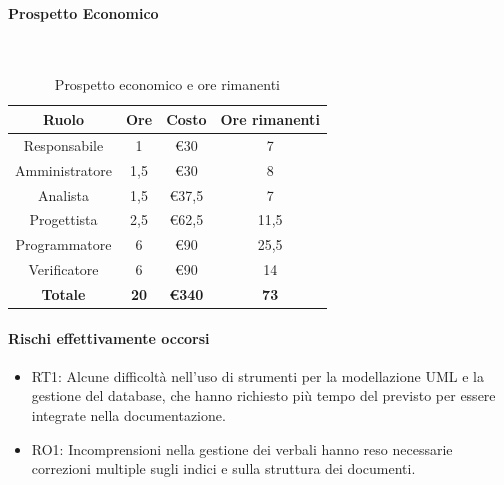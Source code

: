 \documentclass{article}
\begin{document}
            \paragraph{Prospetto Economico}\mbox{}\\
            \begin{table}[H]
                \centering
                \begin{tabular}{|c|c|c|c|}
                \hline
                \textbf{Ruolo}  & \textbf{Ore}  & \textbf{Costo}      & \textbf{Ore rimanenti}   \\ \hline
                Responsabile    & 1             & €30                 & 7                        \\ \hline
                Amministratore  & 1,5           & €30                 & 8                        \\ \hline
                Analista        & 1,5           & €37,5               & 7                        \\ \hline
                Progettista     & 2,5           & €62,5               & 11,5                     \\ \hline
                Programmatore   & 6             & €90                 & 25,5                     \\ \hline
                Verificatore    & 6             & €90                 & 14                       \\ \hline
                \textbf{Totale} & \textbf{20}   & \textbf{\euro340}   & \textbf{73}              \\ \hline
                \end{tabular}
                \caption{Prospetto economico e ore rimanenti}
            \end{table}
            
            \paragraph{Rischi effettivamente occorsi}
            \begin{itemize}
                \item RT1: Alcune difficoltà nell'uso di strumenti per la modellazione UML e la gestione del database, che hanno richiesto più tempo del previsto per essere integrate nella documentazione.
                \item RO1: Incomprensioni nella gestione dei verbali hanno reso necessarie correzioni multiple sugli indici e sulla struttura dei documenti.
            \end{itemize}
            
\end{document}
